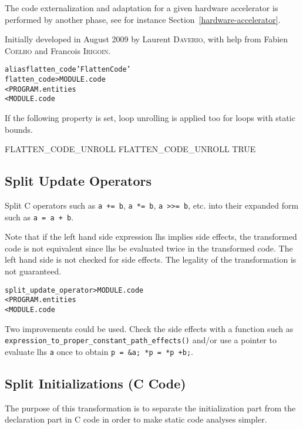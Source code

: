 \documentclass[a4paper]{report}
\newenvironment{PipsMake}{\begin{alltt}}{\end{alltt}}
\newenvironment{PipsPass}[1]{\label{pass:#1}}{}
\begin{document}
The code externalization and adaptation for a given hardware
accelerator is performed by another phase, see for instance
Section~\ref{hardware-accelerator}.

Initially developed in August 2009 by Laurent \textsc{Daverio}, with
help from Fabien \textsc{Coelho} and Francois \textsc{Irigoin}.

\begin{PipsMake}
alias flatten_code 'Flatten Code'
flatten_code > MODULE.code
        < PROGRAM.entities
        < MODULE.code
\end{PipsMake}

If the following property is set, loop unrolling is applied too for loops
with static bounds.
\begin{PipsProp}{FLATTEN_CODE_UNROLL}
FLATTEN_CODE_UNROLL TRUE
\end{PipsProp}


\subsection{Split Update Operators}

\begin{PipsPass}{split_update_operator}
  Split C operators such as \verb/a += b/, \verb/a *= b/, \verb/a >>= b/,
  etc. into their expanded form such as \verb/a = a + b/.
\end{PipsPass}

Note that if the left hand side expression lhs implies side effects,
the transformed code is not equivalent since lhs be evaluated twice in
the transformed code. The left hand side is not checked for side
effects. The legality of the transformation is not guaranteed.

\begin{PipsMake}
split_update_operator > MODULE.code
        < PROGRAM.entities
        < MODULE.code
\end{PipsMake}

Two improvements could be used. Check the side effects with a function
such as \verb/expression_to_proper_constant_path_effects()/ and/or use a
pointer to evaluate lhs \verb/a/ once to obtain
\verb/p = &a; *p = *p +b;/.


\subsection{Split Initializations (C Code)}

\begin{PipsPass}{split_initializations}
The purpose of this transformation is to separate the initialization
part from the declaration part in C code in order to make static code
analyses simpler.
\end{PipsPass}
\end{document}

